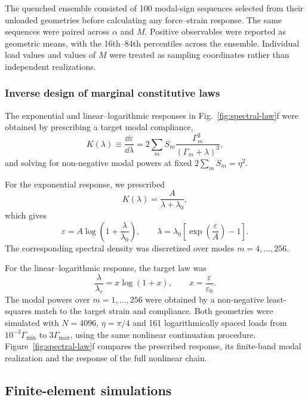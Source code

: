 \documentclass[pdflatex, twocolumn, sn-nature]{sn-jnl}
\begin{document}
The quenched ensemble consisted of 100 modal-sign sequences selected from
their unloaded geometries before calculating any force--strain response. The
same sequences were paired across $\alpha$ and $M$. Positive observables were
reported as geometric means, with the 16th--84th percentiles across the
ensemble. Individual load values and values of $M$ were treated as sampling
coordinates rather than independent realizations.

\subsubsection*{Inverse design of marginal constitutive laws}

The exponential and linear--logarithmic responses in
Fig.~\ref{fig:spectral-law}f were obtained by prescribing a target modal
compliance,
\begin{equation}
K(\lambda)
\equiv
\frac{\dd\varepsilon}{\dd\lambda}
=
2\sum_m S_m
\frac{\Gamma_m^2}{(\Gamma_m+\lambda)^3},
\end{equation}
and solving for non-negative modal powers at fixed
$2\sum_mS_m=\eta^2$.

For the exponential response, we prescribed
\begin{equation}
K(\lambda)=
\frac{A}{\lambda+\lambda_0},
\end{equation}
which gives
\begin{equation}
\varepsilon=
A\log\left(1+\frac{\lambda}{\lambda_0}\right),
\qquad
\lambda=
\lambda_0
\left[
\exp\left(\frac{\varepsilon}{A}\right)-1
\right].
\end{equation}
The corresponding spectral density was discretized over modes
$m=4,\ldots,256$.

For the linear--logarithmic response, the target law was
\begin{equation}
\frac{\lambda}{\lambda_r}
=
x\log(1+x),
\qquad
x=
\frac{\varepsilon}{\varepsilon_0}.
\end{equation}
The modal powers over $m=1,\ldots,256$ were obtained by a non-negative
least-squares match to the target strain and compliance. Both geometries were
simulated with $N=4096$, $\eta=\pi/4$ and 161 logarithmically spaced loads
from $10^{-3}\Gamma_{\min}$ to $3\Gamma_{\max}$, using the same nonlinear
continuation procedure. Figure~\ref{fig:spectral-law}f compares the prescribed
response, its finite-band modal realization and the response of the full
nonlinear chain.

\subsection*{Finite-element simulations}
\label{sec:fem_methods}
\end{document}
